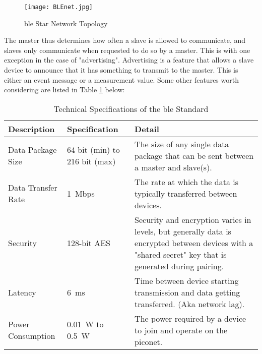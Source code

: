 \begin{figure}[H]
	\begin{center}
		\texttt{[image: BLEnet.jpg]}
		\caption{\ac{ble} Star Network Topology}
		\label{fig:ble}
	\end{center}
\end{figure}

The master thus determines how often a slave is allowed to communicate, and slaves only communicate when requested to do so by a master. This is with one exception in the case of "advertising". Advertising is a feature that allows a slave device to announce that it has something to transmit to the master. This is either an event message or a measurement value.
\newpage
Some other features worth considering are listed in Table \ref{tab:ble} below:
\begin{table}[H]
	\renewcommand{\arraystretch}{1.5}
	\centering
	\caption{Technical Specifications of the \ac{ble} Standard}
	\begin{tabularx}{0.9\textwidth}{>{\raggedright}p{2.5cm} >{\raggedright}p{3cm} >{\raggedright\arraybackslash}X}
		\toprule
		Description        & Specification                       & Detail                                                                                                                                                 \\
		\midrule
		Data Package Size  & 64 bit (min) to 216 bit (max)       & The size of any single data package that can be sent between a master and slave(s).                                                                    \\
		Data Transfer Rate & \SI{1}{Mbps}                        & The rate at which the data is typically transferred between devices.                                                                                   \\
		Security           & 128-bit AES                         & Security and encryption varies in levels, but generally data is encrypted between devices with a "shared secret" key that is generated during pairing. \\
		Latency            & \SI{6}{\milli\second}               & Time between device starting transmission and data getting transferred. (Aka network lag).                                                             \\
		Power Consumption  & \SI{0.01}{\watt} to \SI{0.5}{\watt} & The power required by a device to join and operate on the piconet.                                                                                     \\
		\bottomrule
	\end{tabularx}
	\label{tab:ble}
\end{table}


